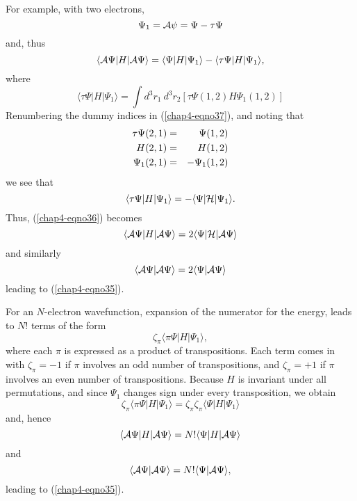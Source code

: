 {For example, with two electrons,
\begin{equation}
\Psi_1 = {\cal A} \psi = \Psi - \tau \Psi
\end{equation}
and, thus
\begin{equation}
\langle {\cal A} \Psi | H | {\cal A} \Psi \rangle = \langle 
\Psi | H | \Psi_1 \rangle - \langle \tau \Psi | H | \Psi_1 
\rangle,
\label{chap4-eqno36}
\end{equation}
where
\begin{equation}
\langle \tau \Psi | H | \Psi_1 \rangle = 
\int d^3r_1\ d^3r_2 \left[\tau\Psi(1,2)H\Psi_1(1,2)\right]
\label{chap4-eqno37}
\end{equation}
Renumbering the dummy indices in (\ref{chap4-eqno37}), and noting that
\begin{eqnarray}
\tau \Psi ( 2 , 1 ) &=& \Psi (1,2)\cr
H (2,1) &=& H (1,2)\cr
\Psi_1 (2,1) &=& - \Psi_1 (1,2)
\end{eqnarray}
we see that
\begin{equation}
\langle \tau \Psi | H | \Psi_1 \rangle = - \langle \Psi | {\cal 
H} | \Psi_1 \rangle .
\end{equation}
Thus, (\ref{chap4-eqno36}) becomes
\begin{equation}
\langle {\cal A} \Psi | H | {\cal A} \Psi\rangle = 2 \langle \Psi | {\cal 
H} | {\cal A} \Psi \rangle
\end{equation}
and similarly
\begin{equation}
\langle {\cal A} \Psi | {\cal A} \Psi \rangle = 2 \langle \Psi | {\cal A} 
\Psi \rangle
\end{equation}
leading to (\ref{chap4-eqno35}).

For an $N$-electron wavefunction, expansion of the numerator for the 
energy, leads to $N!$ terms of the form
\begin{equation}
\zeta_{\pi} \langle \pi \Psi | H | \Psi_1 \rangle ,
\end{equation}
where each $\pi$ is expressed as a product of transpositions.  Each term 
comes in with $\zeta_{\pi} = -1$ if $\pi$ involves an odd number of 
transpositions, and $\zeta_{\pi} = +1$ if $\pi$
involves an even number of transpositions. Because $H$ is invariant 
under all permutations, and since $\Psi_1$ changes sign under every 
transposition, we obtain
\begin{equation}
\zeta_{\pi} \langle \pi \Psi | H | \Psi_1 \rangle = \zeta_{\pi} 
\zeta_{\pi} \langle \Psi | H | \Psi_1 \rangle
\end{equation}
and, hence
\begin{equation}
\langle {\cal A} \Psi | H | {\cal A} \Psi \rangle = N! \langle 
\Psi | H | {\cal A} \Psi \rangle
\end{equation}
and
\begin{equation}
\langle {\cal A} \Psi | {\cal A} \Psi \rangle = N! \langle \Psi | {\cal A} 
\Psi \rangle ,
\end{equation}
leading to (\ref{chap4-eqno35}).

}
